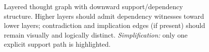 \begin{figure}[t]
  \centering
  
  \caption{Layered thought graph with downward support/dependency structure. Higher layers should admit dependency witnesses toward lower layers; contradiction and implication edges (if present) should remain visually and logically distinct. \emph{Simplification:} only one explicit support path is highlighted.}
  \label{fig:layers}
\end{figure}
